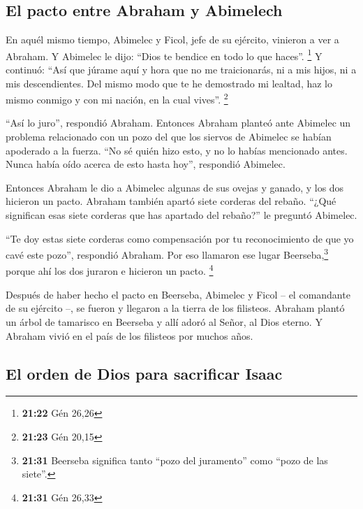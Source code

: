 \hypertarget{el-pacto-entre-abraham-y-abimelech}{%
\subsection{El pacto entre Abraham y
Abimelech}\label{el-pacto-entre-abraham-y-abimelech}}

 En aquél mismo tiempo, Abimelec y Ficol, jefe de su
ejército, vinieron a ver a Abraham. Y Abimelec le dijo: ``Dios te
bendice en todo lo que haces''. \footnote{\textbf{21:22} Gén 26,26}
 Y continuó: ``Así que júrame aquí y hora que no me
traicionarás, ni a mis hijos, ni a mis descendientes. Del mismo modo que
te he demostrado mi lealtad, haz lo mismo conmigo y con mi nación, en la
cual vives''. \footnote{\textbf{21:23} Gén 20,15}

 ``Así lo juro'', respondió Abraham. 
Entonces Abraham planteó ante Abimelec un problema relacionado con un
pozo del que los siervos de Abimelec se habían apoderado a la fuerza.
 ``No sé quién hizo esto, y no lo habías mencionado
antes. Nunca había oído acerca de esto hasta hoy'', respondió Abimelec.

 Entonces Abraham le dio a Abimelec algunas de sus ovejas
y ganado, y los dos hicieron un pacto.  Abraham también
apartó siete corderas del rebaño.  ``¿Qué significan esas
siete corderas que has apartado del rebaño?'' le preguntó Abimelec.

 ``Te doy estas siete corderas como compensación por tu
reconocimiento de que yo cavé este pozo'', respondió Abraham.
 Por eso llamaron ese lugar Beerseba,\footnote{\textbf{21:31}
  Beerseba significa tanto ``pozo del juramento'' como ``pozo de las
  siete''.} porque ahí los dos juraron e hicieron un pacto. \footnote{\textbf{21:31}
  Gén 26,33}

 Después de haber hecho el pacto en Beerseba, Abimelec y
Ficol -- el comandante de su ejército --, se fueron y llegaron a la
tierra de los filisteos.  Abraham plantó un árbol de
tamarisco en Beerseba y allí adoró al Señor, al Dios eterno.
 Y Abraham vivió en el país de los filisteos por muchos
años.

\hypertarget{el-orden-de-dios-para-sacrificar-isaac}{%
\subsection{El orden de Dios para sacrificar
Isaac}\label{el-orden-de-dios-para-sacrificar-isaac}}

